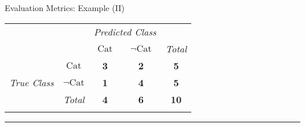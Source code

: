 \begin{frame}{Evaluation Metrics: Example (II)}

	\vspace*{-1em}

	\begin{center}
		\begin{tabular}{lp{1cm}p{1cm}p{1cm}p{1cm}}
			                                                           &                                                              & \multicolumn{2}{c}{\textit{Predicted Class}}            & \multicolumn{1}{l}{}                                                                              \\ \cline{3-4}
			                                                           & \multicolumn{1}{l|}{}                                        & \multicolumn{1}{c|}{\cellcolor{faugray!62}$\text{Cat}$} & \multicolumn{1}{c|}{\cellcolor{faugray!62}$\neg \text{Cat}$} & \multicolumn{1}{l}{\textit{Total}} \\ \cline{2-5}
			\multicolumn{1}{c|}{}                                      & \multicolumn{1}{c|}{\cellcolor{faugray!62}$\text{Cat}$}      & \multicolumn{1}{c|}{\textbf{3}}                         & \multicolumn{1}{c|}{\textbf{2}}                              & \multicolumn{1}{c}{\textbf{5}}     \\ \cline{2-4}
			\multicolumn{1}{c|}{\multirow{-2}{*}{\textit{True Class}}} & \multicolumn{1}{c|}{\cellcolor{faugray!62}$\neg \text{Cat}$} & \multicolumn{1}{c|}{\textbf{1}}                         & \multicolumn{1}{c|}{\textbf{4}}                              & \multicolumn{1}{c}{\textbf{5}}     \\ \cline{2-5}
			\multicolumn{2}{r|}{\textit{Total}}                        & \multicolumn{1}{c}{\textbf{4}}                               & \multicolumn{1}{c|}{\textbf{6}}                         & \multicolumn{1}{c}{\textbf{10}}                                                                   \\
			                                                           &                                                              &                                                         &                                                              &
		\end{tabular}
	\end{center}

	\vspace*{-0.25cm}

	\rule{\textwidth}{0.4pt}


\end{frame}
